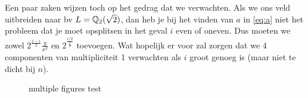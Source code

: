 Een paar zaken wijzen toch op het gedrag dat we verwachten.  
Als we ons veld uitbreiden naar bv $L = \mathbb{Q}_2(\sqrt{2}) $, dan heb je bij het vinden van $a$ in \eqref{eq:a} niet het probleem dat je moet opsplitsen in het geval $i$ even of oneven. Dus moeten we zowel $2^{\frac{1-i}{2}}\frac{y}{x^2}$ en $2^{\frac{i /2}{\frac{y}{x}}}$ toevoegen. 
Wat hopelijk er voor zal zorgen dat we 4 componenten van multipliciteit 1 verwachten als $i$ groot genoeg is (maar niet te dicht bij $n $). 

\begin{figure}[ht]
    \centering
    \caption{multiple figures test}
    \label{fig:multiple-figures-test}
\end{figure}
